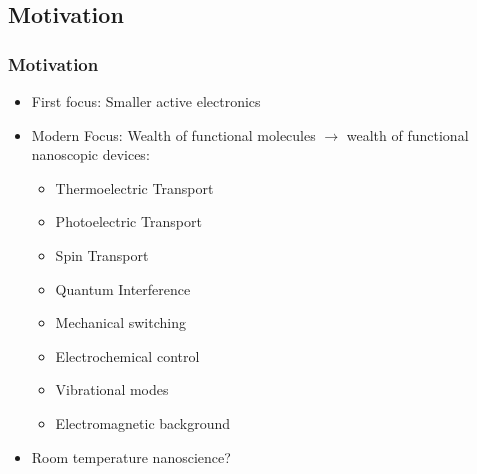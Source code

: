 \subsection*{Motivation}
\begin{frame}
    \frametitle{Motivation}
    \begin{itemize}
        \item First focus: Smaller active electronics
        \item Modern Focus: Wealth of functional molecules $\rightarrow$ wealth of functional nanoscopic devices:
        \begin{itemize}
            \item Thermoelectric Transport
            \item Photoelectric Transport
            \item Spin Transport
            \item Quantum Interference
            \item Mechanical switching
            \item Electrochemical control
            \item Vibrational modes
            \item Electromagnetic background
        \end{itemize}
        \item Room temperature nanoscience?
    \end{itemize}
\end{frame}
